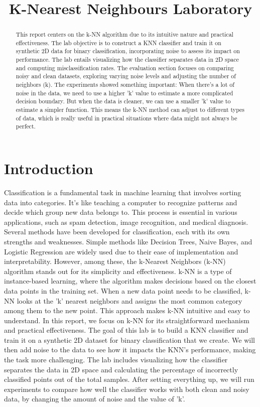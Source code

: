 \documentclass[a4paper,10pt,oneside]{article}
\title{K-Nearest Neighbours Laboratory}
\begin{document}
\maketitle

\begin{abstract}
This report centers on the k-NN algorithm due to its intuitive nature and 
practical effectiveness. The lab objective is to construct a KNN classifier
and train it on synthetic 2D data for binary classification, incorporating noise 
to assess its impact on performance. 
The lab entails visualizing how the classifier separates data in 2D space and computing misclassification rates. The evaluation section focuses on comparing noisy and clean datasets, exploring varying noise levels and adjusting the number of neighbors (k).
The experiments showed something important: 
When there's a lot of noise in the data, we need to use a higher 'k' 
value to estimate a more complicated decision boundary.
But when the data is cleaner, we can use a smaller 'k' value to estimate a 
simpler function.
This means the k-NN method can adjust to different types of data, which is 
really useful in practical situations where data might not always be perfect.
\end{abstract}


\section{Introduction}
\label{sec:intro}

Classification is a fundamental task in machine learning that involves sorting 
data into categories. It's like teaching a computer to recognize patterns and 
decide which group new data belongs to. 
This process is essential in various applications, such as spam detection, 
image recognition, and medical diagnosis.
Several methods have been developed for classification, each with its own 
strengths and weaknesses. Simple methods like Decision Trees, Naive Bayes, 
and Logistic Regression are widely used due to their ease of implementation 
and interpretability. However, among these, the k-Nearest Neighbors (k-NN) 
algorithm stands out for its simplicity and effectiveness.
k-NN is a type of instance-based learning, where the algorithm makes decisions 
based on the closest data points in the training set. When a new data point needs
to be classified, k-NN looks at the 'k' nearest neighbors and assigns the most
common category among them to the new point. This approach makes k-NN intuitive
and easy to understand.
In this report, we focus on k-NN for its straightforward mechanism and practical
effectiveness. 
The goal of this lab is to build a KNN classifier and train it on a synthetic
 2D dataset for binary classification that we create. We will then add noise to
the data to see how it impacts the KNN's performance, making the task more challenging. The lab includes visualizing how the classifier separates the data in 2D space and calculating the percentage of incorrectly classified points out of the total samples.
After setting everything up, we will run experiments to compare how well the classifier works with both clean and noisy data, by changing the amount of noise and the value of 'k'.
\end{document}
